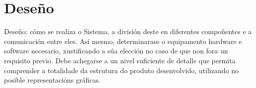 \chapter{Deseño}

Deseño: cómo se realiza o Sistema, a división deste en diferentes compoñentes e
a comunicación entre eles. Así mesmo, determinarase o equipamento hardware e
software necesario, xustificando a súa elección no caso de que non fora un
requisito previo. Debe achegarse a un nivel suficiente de detalle que permita
comprender a totalidade da estrutura do produto desenvolvido, utilizando no 
posible representacións gráficas.
